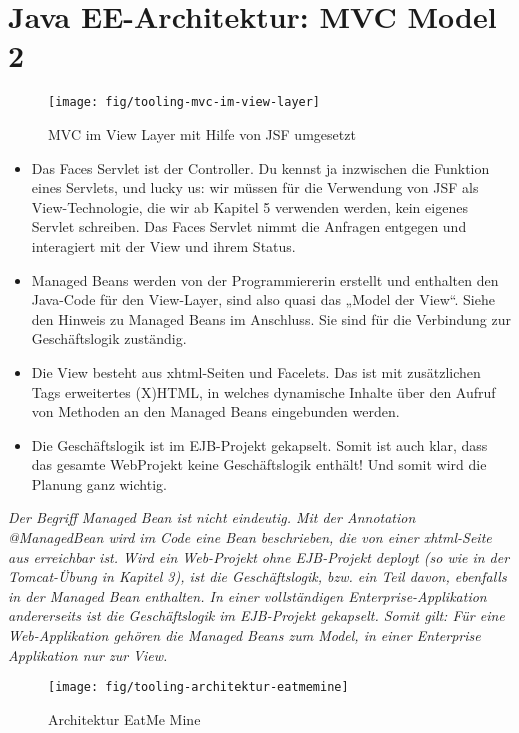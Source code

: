 \section{Java EE-Architektur: MVC Model 2}

\begin{figure}[h!]
\centering
\texttt{[image: fig/tooling-mvc-im-view-layer]}
\caption{MVC im View Layer mit Hilfe von JSF umgesetzt}
\label{fig:tooling-mvc-im-view-layer}
\end{figure}
\begin{itemize}
	\item Das Faces Servlet ist der Controller. Du kennst ja inzwischen die Funktion eines Servlets, und
	lucky us: wir müssen für die Verwendung von JSF als View-Technologie, die wir ab Kapitel 5
	verwenden werden, kein eigenes Servlet schreiben. Das Faces Servlet nimmt die Anfragen
	entgegen und interagiert mit der View und ihrem Status.
	\item Managed Beans werden von der Programmiererin erstellt und enthalten den Java-Code für den
	View-Layer, sind also quasi das „Model der View“. Siehe den Hinweis zu Managed Beans im
	Anschluss. Sie sind für die Verbindung zur Geschäftslogik zuständig.
	\item  Die View besteht aus xhtml-Seiten und Facelets. Das ist mit zusätzlichen Tags erweitertes
	(X)HTML, in welches dynamische Inhalte über den Aufruf von Methoden an den Managed Beans
	eingebunden werden.
	\item  Die Geschäftslogik ist im EJB-Projekt gekapselt. Somit ist auch klar, dass das gesamte WebProjekt
	keine Geschäftslogik enthält! Und somit wird die Planung ganz wichtig.
\end{itemize}

\emph{Der Begriff Managed Bean ist nicht eindeutig. Mit der Annotation @ManagedBean wird im Code eine Bean beschrieben, die von einer xhtml-Seite aus erreichbar ist. Wird ein Web-Projekt ohne	EJB-Projekt deployt (so wie in der Tomcat-Übung in Kapitel 3), ist die Geschäftslogik, bzw. ein Teil davon, ebenfalls in der Managed Bean enthalten. In einer vollständigen Enterprise-Applikation andererseits ist die Geschäftslogik im EJB-Projekt gekapselt. Somit gilt: Für eine Web-Applikation gehören die Managed Beans zum Model, in einer Enterprise Applikation nur zur View.}

\begin{figure}[h!]
\centering
\texttt{[image: fig/tooling-architektur-eatmemine]}
\caption{Architektur EatMe Mine}
\label{fig:tooling-architektur-eatmemine}
\end{figure}

